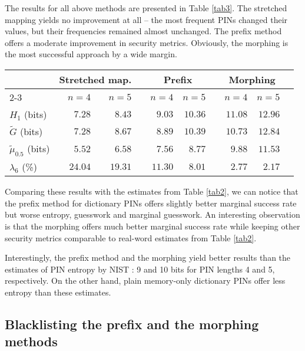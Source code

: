 \documentclass[a4paper, 11pt]{article}
\newcommand{\ra}[1]{\renewcommand{\arraystretch}{#1}}
\begin{document}
The results for all above methods are presented in Table \ref{tab3}. The stretched mapping yields no 
improvement at all -- the most frequent PINs changed their values, but their frequencies remained almost
unchanged. The prefix method offers a moderate improvement in security metrics. Obviously, the morphing 
is the most successful approach by a wide margin.

\begin{table*}[h]\centering
\ra{1.2}
\begin{tabular}{@{}lrrrrrrrrr@{}}\toprule
 & \multicolumn{2}{c}{Stretched map.} &\phantom{a} & \multicolumn{2}{c}{Prefix} &\phantom{a} & \multicolumn{2}{c}{Morphing} \\
   \cmidrule{2-3} \cmidrule{5-6} \cmidrule{8-9}
 & $n=4$ & $n=5$ && $n=4$ & $n=5$ && $n=4$ & $n=5$ \\ 
\midrule
$H_1$ (bits) & $7.28$ & $8.43$ && $9.03$ & $10.36$ && $11.08$ & $12.96$ \\
$\tilde G$  (bits)  & $7.28$ & $8.67$ && $8.89$ & $10.39$ && $10.73$ & $12.84$ \\
$\tilde \mu_{0.5}$ (bits) & $5.52$ & $6.58$ && $7.56$ & $8.77$ && $9.88$ & $11.53$ \\
$\lambda_{6}$ (\%)  & $24.04$ & $19.31$ && $11.30$ & $8.01$ && $2.77$ & $2.17$ \\
\bottomrule
\end{tabular}
\caption{Modifications of PIN constructions -- results based on SUBTLEXus}\label{tab3}
\end{table*}

Comparing these results with the estimates from Table \ref{tab2}, we can notice that the prefix method
for dictionary PINs offers slightly better marginal success rate but worse entropy, guesswork and marginal guesswork. 
An interesting observation is that the morphing offers much better marginal success rate while keeping other
security metrics comparable to real-word estimates from Table \ref{tab2}.

Interestingly, the prefix method and the morphing yield better results than the estimates of PIN entropy 
by NIST \cite{NIST}: 9 and 10 bits for PIN lengths 4 and 5, respectively. On the other hand, plain memory-only
dictionary PINs offer less entropy than these estimates.

\subsection{Blacklisting the prefix and the morphing methods}
\end{document}
